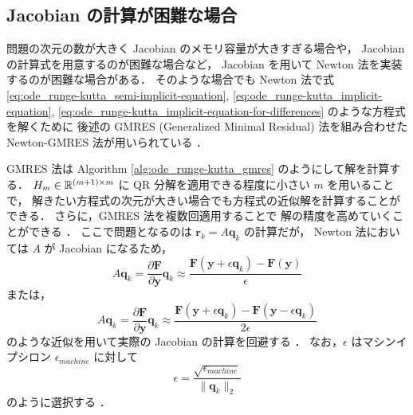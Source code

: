 \subsection{Jacobian の計算が困難な場合}

問題の次元の数が大きく Jacobian のメモリ容量が大きすぎる場合や，
Jacobian の計算式を用意するのが困難な場合など，
Jacobian を用いて Newton 法を実装するのが困難な場合がある．
そのような場合でも Newton 法で式
\eqref{eq:ode_runge-kutta_semi-implicit-equation},
\eqref{eq:ode_runge-kutta_implicit-equation},
\eqref{eq:ode_runge-kutta_implicit-equation-for-differences}
のような方程式を解くために
後述の GMRES (Generalized Minimal Residual)  法を組み合わせた
Newton-GMRES 法が用いられている
\cite{Blom2016, Blom2013}．

GMRES 法は Algorithm \ref{alg:ode_runge-kutta_gmres} のようにして解を計算する．
$H_m \in \mathbb{R}^{(m + 1) \times m}$ に QR 分解を適用できる程度に小さい $m$ を用いることで，
解きたい方程式の次元が大きい場合でも方程式の近似解を計算することができる．
さらに，GMRES 法を複数回適用することで
解の精度を高めていくことができる
\cite{Golub2013,Blom2013}．
ここで問題となるのは $\bm{r}_k = A \bm{q}_k$ の計算だが，
Newton 法においては $A$ が Jacobian になるため，
\begin{equation}
    A \bm{q}_k
    =
    \frac{\partial \bm{F}}{\partial \bm{y}}
    \bm{q}_k
    \approx
    \frac{\bm{F}(\bm{y} + \epsilon \bm{q}_k) - \bm{F}(\bm{y})}{\epsilon}
\end{equation}
または，
\begin{equation}
    A \bm{q}_k
    =
    \frac{\partial \bm{F}}{\partial \bm{y}}
    \bm{q}_k
    \approx
    \frac{\bm{F}(\bm{y} + \epsilon \bm{q}_k) - \bm{F}(\bm{y} - \epsilon \bm{q}_k)}{2 \epsilon}
\end{equation}
のような近似を用いて実際の Jacobian の計算を回避する
\cite{Blom2016, Blom2013}．
なお，$\epsilon$ はマシンイプシロン $\epsilon_{machine}$ に対して
\begin{equation}
    \epsilon = \frac{\sqrt{\epsilon_{machine}}}{\|\bm{q}_k\|_2}
\end{equation}
のように選択する
\cite{Blom2016, Blom2013}．

